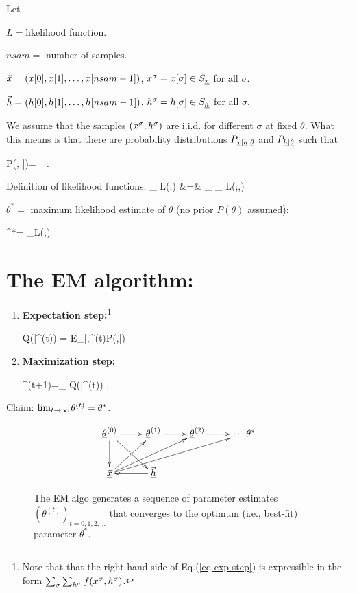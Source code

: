 Let

$ L=$likelihood
function.

$nsam=$ number of samples.

${\vec{x}}=(x[0], x[1], \ldots, x[nsam-1])$,
 $x^\sigma=x[\sigma]\in S_{\underline{x}}$ for all $\sigma$.

${\vec{h}}=(h[0], h[1], \ldots, h[nsam-1])$,
$h^\sigma=h[\sigma]\in S_{\underline{h}}$ for all $\sigma$.

We assume that the samples $(x^\sigma,h^\sigma)$
are i.i.d. for different $\sigma$ at fixed
$\theta$.
What this means is that
there are
probability distributions
$P_{{\underline{x}}|{\underline{h}},\underline{\theta}}$
and $P_{{\underline{h}}|\underline{\theta}}$
such that

\beq
P(\vecx, \vech|\theta)=
\prod_\sigma {}
\;.
\eeq

Definition of likelihood functions:
\beqa
{}
_{ L(\theta;\vecx)}
&=&
\sum_{\vech}
_{ L(\theta;\vecx,\vech)}
\eeqa


$\theta^*=$ maximum likelihood
estimate of $\theta$ (no prior $P(\theta)$
assumed):

\beq
\theta^*=
\argmax_\theta L(\theta;\vecx)
\eeq

\section{The EM algorithm:}
\begin{enumerate}
\item{\bf Expectation step:}\footnote{
Note that
that
the right hand side of
Eq.(\ref{eq-exp-step})
is expressible
in the form $\sum_\sigma
\sum_{h^\sigma}f(x^\sigma,
h^\sigma)$.}

\beq
Q(\theta|\theta^{(t)})
=
E_{\vech|\vecx,\theta^{(t)}}\ln P(\vecx,\vech|\theta)
\label{eq-exp-step}
\eeq

\item{\bf Maximization step:}

\beq
\theta^{(t+1)}=\argmax_\theta
Q(\theta|\theta^{(t)})
\label{eq-maxi-step}
\;.
\eeq
\end{enumerate}


Claim: $\lim_{t\rightarrow \infty}
\theta^{(t)}=\theta^*$.

\begin{figure}[h!]
$$\xymatrix{
\ul{\theta}^{(0)}\ar[d]\ar[dr]\ar[r]
&\ul{\theta}^{(1)}\ar[r]
&\ul{\theta}^{(2)}\ar[r]
&\cdots\theta^*
\\
\ul{\vecx}\ar[ru]\ar[rru]\ar[urrr]
&\ul{\vech}\ar[l]
}$$
\caption{
The EM algo generates
a sequence of
parameter estimates
$(\theta^{(t)})_{t=0, 1,2, \ldots}$
that converges to the optimum (i.e.,
best-fit) parameter $\theta^*$.
}
\label{fig-emax-dynamical-bnet}
\end{figure}

